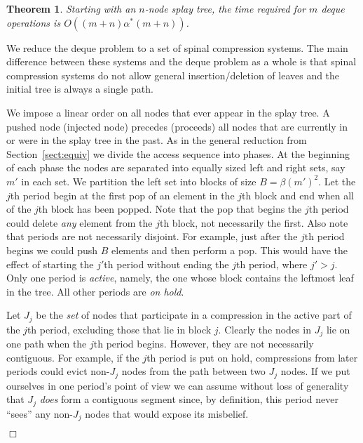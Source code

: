 \documentclass{article}
\newenvironment{proof}{\noindent {\bf Proof:}}{\hfill$\Box$}
\newtheorem{theorem}{Theorem}[section]
\begin{document}
\begin{theorem}
Starting with an $n$-node splay tree, the time required for $m$ deque operations
is $O((m+n)\alpha^*(m+n))$.
\end{theorem}

\begin{proof}
We reduce the deque problem to a set of spinal compression systems.  The main difference
between these systems and the deque problem as a whole is that spinal compression systems
do not allow general insertion/deletion of leaves and the initial tree is always a single path.

We impose a linear order on all nodes that
ever appear in the splay tree.  A pushed node (injected node) precedes (proceeds)
all nodes that are currently in or were in the splay tree in the past.  
As in the general reduction from Section~\ref{sect:equiv} we divide the access sequence into phases.
At the beginning of each phase the nodes are separated into equally sized left and right sets, say $m'$ in each set.
We partition the left set into blocks of size $B= \beta(m')^2$.
Let the $j$th period begin at the first pop of an element in the $j$th block and end
when all of the $j$th block has been popped.  Note that the pop that begins the $j$th period
could delete {\em any} element from the $j$th block, not necessarily the first.
Also note that periods are not necessarily disjoint.  For example, just after the $j$th period begins
we could push $B$ elements and then perform a pop.  This would have the effect of starting the
$j'$th period without ending the $j$th period, where $j'>j$.  Only one period is {\em active}, namely, the 
one whose block contains the leftmost leaf in the tree.  All other periods are {\em on hold}.

Let $J_j$ be the {\em set} of nodes that participate in a compression in the active part of the $j$th period,
excluding those that lie in block $j$.  Clearly the nodes in $J_j$ lie on one path when the $j$th period begins.
However, they are not necessarily contiguous.  For example, if the $j$th period is put on hold, compressions
from later periods could evict non-$J_j$ nodes from the path between two $J_j$ nodes.
If we put ourselves in one period's point of view we can assume without loss of generality that $J_j$ {\em does}
form a contiguous segment since, by definition, this period never ``sees'' any non-$J_j$ nodes that would expose 
its misbelief.


\end{proof}
\end{document}
